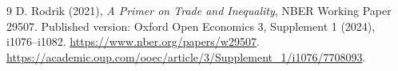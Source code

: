 \documentclass[11pt]{article}
\theoremstyle{definition}
\begin{document}
\begin{thebibliography}{9}
 D. Rodrik (2021), \emph{A Primer on Trade and Inequality},
NBER Working Paper 29507. Published version: Oxford Open Economics 3,
Supplement 1 (2024), i1076--i1082.
\url{https://www.nber.org/papers/w29507}.
\url{https://academic.oup.com/ooec/article/3/Supplement_1/i1076/7708093}.
\end{thebibliography}
\end{document}
